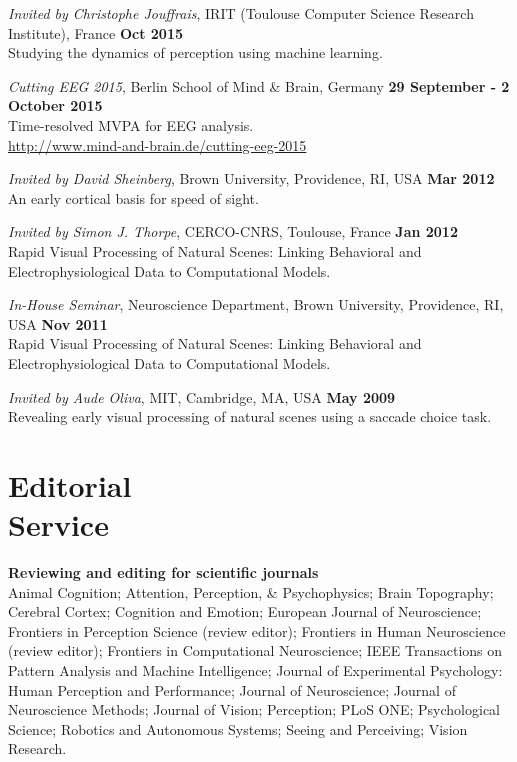 \documentclass[margin,line]{resume}
\begin{document}
\begin{resume}
\textit{Invited by Christophe Jouffrais}, IRIT (Toulouse Computer Science Research Institute), France \hfill \textbf{Oct 2015}\\
Studying the dynamics of perception using machine learning.

\textit{Cutting EEG 2015}, Berlin School of Mind \& Brain, Germany \hfill \textbf{29 September - 2 October 2015}\\
Time-resolved MVPA for EEG analysis. \\
\url{http://www.mind-and-brain.de/cutting-eeg-2015}
	
\textit{Invited by David Sheinberg}, Brown University, Providence, RI, USA \hfill \textbf{Mar 2012}\\
An early cortical basis for speed of sight. 

\vspace{-2mm} 
\textit{Invited by Simon J. Thorpe}, CERCO-CNRS, Toulouse, France \hfill \textbf{Jan 2012}\\
Rapid Visual Processing of Natural Scenes: Linking Behavioral and Electrophysiological Data to Computational Models.

\vspace{-2mm} 
\textit{In-House Seminar}, Neuroscience Department, Brown University, Providence, RI, USA \hfill \textbf{Nov 2011}\\
Rapid Visual Processing of Natural Scenes: Linking Behavioral and Electrophysiological Data to Computational Models.

\vspace{-2mm} 
\textit{Invited by Aude Oliva}, MIT, Cambridge, MA, USA \hfill \textbf{May 2009}\\
Revealing early visual processing of natural scenes using a saccade choice task.

\normalsize


	\vspace{3mm}
	\section{\mysidestyle Editorial\\Service}

 \textbf{Reviewing and editing for scientific journals} \\
Animal Cognition; 
Attention, Perception, \& Psychophysics; 
Brain Topography;  
Cerebral Cortex; 
Cognition and Emotion;
European Journal of Neuroscience;
Frontiers in Perception Science (review editor); 
Frontiers in Human Neuroscience (review editor); 
Frontiers in Computational Neuroscience; 
IEEE Transactions on Pattern Analysis and Machine Intelligence;
Journal of Experimental Psychology: Human Perception and Performance;
Journal of Neuroscience;
Journal of Neuroscience Methods;
Journal of Vision;
Perception;
PLoS ONE; 
Psychological Science;
Robotics and Autonomous Systems;
Seeing and Perceiving;
Vision Research.


\end{resume}
\end{document}
